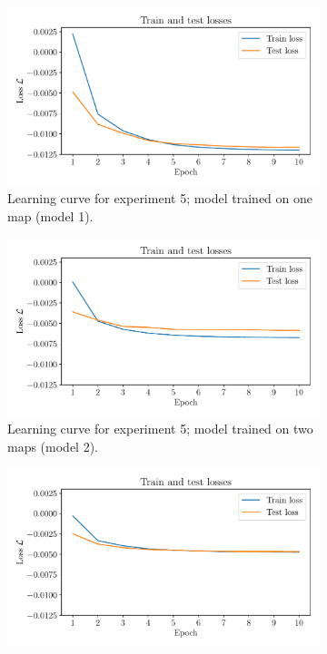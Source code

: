 \documentclass[a4paper,11pt]{report}
\begin{document}
\begin{figure}[h]
	\centering
	\begin{subfigure}[t]{0.32\textwidth}
		\centering
		\includegraphics[width=\textwidth]{figures/nf-milne-eddington-example-5-loss-1train-nflows-piecewisequadratic.pdf}
		\caption{Learning curve for experiment 5; model trained on one map (model 1).}
		\label{fig:nf-milne-eddington-example-5-loss-1train-nflows-piecewisequadratic}
	\end{subfigure}
	\hfill
	\begin{subfigure}[t]{0.32\textwidth}
		\centering
		\includegraphics[width=\textwidth]{figures/nf-milne-eddington-example-5-loss-2train-nflows-piecewisequadratic.pdf}
		\caption{Learning curve for experiment 5; model trained on two maps (model 2).}
		\label{fig:nf-milne-eddington-example-5-loss-2train-nflows-piecewisequadratic}
	\end{subfigure}
	\hfill
	\begin{subfigure}[t]{0.32\textwidth}
		\centering
		\includegraphics[width=\textwidth]{figures/nf-milne-eddington-example-5-loss-3train-nflows-piecewisequadratic.pdf}

\end{subfigure}
\end{figure}
\end{document}
